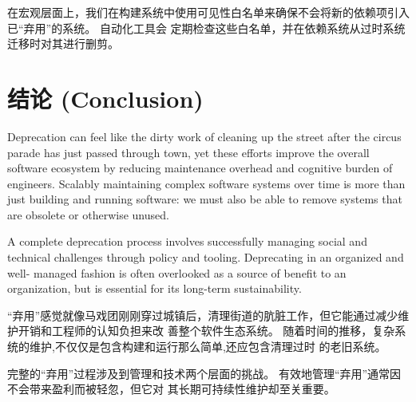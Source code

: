\documentclass[10pt,a4paper,UTF8]{ctexart}
\begin{document}
在宏观层面上，我们在构建系统中使用可见性白名单来确保不会将新的依赖项引入已“弃用”的系统。 自动化工具会
定期检查这些白名单，并在依赖系统从过时系统迁移时对其进行删剪。

\section{结论 (Conclusion)}
\label{sec:org9a135e3}

Deprecation can feel like the dirty work of cleaning up the street after the circus parade has just
passed through town, yet these efforts improve the overall software ecosystem by reducing
maintenance overhead and cognitive burden of engineers. Scalably maintaining complex software
systems over time is more than just building and running software: we must also be able to remove
systems that are obsolete or otherwise unused.

A complete deprecation process involves successfully managing social and technical challenges
through policy and tooling. Deprecating in an organized and well- managed fashion is often
overlooked as a source of benefit to an organization, but is essential for its long-term
sustainability.

“弃用”感觉就像马戏团刚刚穿过城镇后，清理街道的肮脏工作，但它能通过减少维护开销和工程师的认知负担来改
善整个软件生态系统。 随着时间的推移，复杂系统的维护,不仅仅是包含构建和运行那么简单,还应包含清理过时
的老旧系统。

完整的“弃用”过程涉及到管理和技术两个层面的挑战。 有效地管理“弃用”通常因不会带来盈利而被轻忽，但它对
其长期可持续性维护却至关重要。
\end{document}

